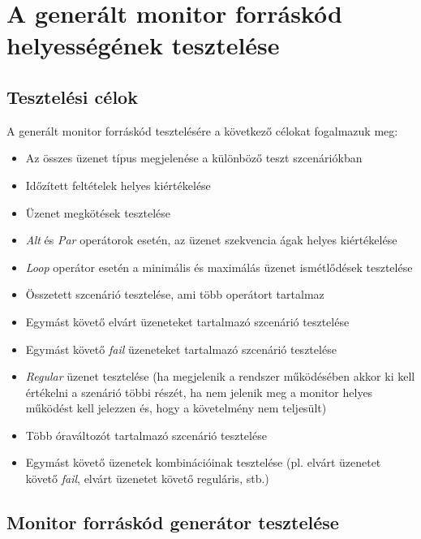 \chapter{A generált monitor forráskód helyességének tesztelése}

\section{Tesztelési célok}

A generált monitor forráskód tesztelésére a következő célokat fogalmazuk meg:

\begin{itemize}
    \item Az összes üzenet típus megjelenése a különböző teszt szcenáriókban
    \item Időzített feltételek helyes kiértékelése
    \item Üzenet megkötések tesztelése
    \item \textit{Alt} és \textit{Par} operátorok esetén, az üzenet szekvencia ágak helyes kiértékelése
    \item \textit{Loop} operátor esetén a minimális és maximálás üzenet ismétlődések tesztelése
    \item Összetett szcenárió tesztelése, ami több operátort tartalmaz
    \item Egymást követő elvárt üzeneteket tartalmazó szcenárió tesztelése
    \item Egymást követő \textit{fail} üzeneteket tartalmazó szcenárió tesztelése
    \item \textit{Regular} üzenet tesztelése (ha megjelenik a rendszer működésében akkor ki kell értékelni a szenárió többi részét, ha nem jelenik meg a monitor helyes működést kell jelezzen és, hogy a követelmény nem teljesült)
    \item Több óraváltozót tartalmazó szcenárió tesztelése
    \item Egymást követő üzenetek kombinációinak tesztelése (pl. elvárt üzenetet követő \textit{fail}, elvárt üzenetet követő reguláris, stb.)
\end{itemize}

\clearpage\section{Monitor forráskód generátor tesztelése}

